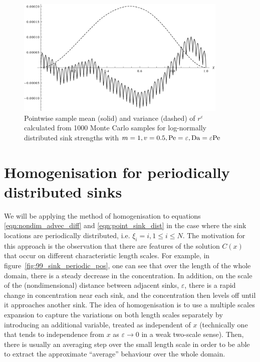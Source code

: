 \begin{figure}[ht!]
    \centering
    \includegraphics[width=0.9\textwidth]{continuum/figures/strength_lognormal_dist/av_res_var_1000_samples}
    \caption{\label{fig:log_normal_1000_av_residuals}Pointwise sample mean
    (solid) and variance (dashed) of \(r^\varepsilon\) calculated from
    1000 Monte Carlo samples for log-normally distributed sink strengths with
    \({m=1}, {v=0.5},
    {\mathrm{Pe}=\varepsilon}, {\mathrm{Da}=\varepsilon\mathrm{Pe}}\)}
\end{figure}

\FloatBarrier

\section{Homogenisation for periodically distributed sinks}

We will be applying the method of homogenisation to equations
\eqref{eqn:nondim_advec_diff} and \eqref{eqn:point_sink_dist} in the case where
the sink locations are periodically distributed, i.e. \(\xi_i = i, 1 \le i \le
N\). The motivation for this approach is the observation that there are features
of the solution \(C(x)\) that occur on different characteristic length scales.
For example, in figure~\ref{fig:99_sink_periodic_pos}, one can see that over the
length of the whole domain, there is a steady decrease in the concentration. In
addition, on the scale of the (nondimensional) distance between adjacent sinks,
\(\varepsilon\), there is a rapid change in concentration near each sink, and
the concentration then levels off until it approaches another sink. The idea of
homogenisation is to use a multiple scales expansion to capture the variations
on both length scales separately by introducing an additional variable, treated
as independent of \(x\) (technically one that tends to independence from \(x\)
as \(\varepsilon \to 0\) in a weak two-scale sense).  Then, there is usually an
averaging step over the small length scale in order to be able to extract the
approximate ``average'' behaviour over the whole domain.

